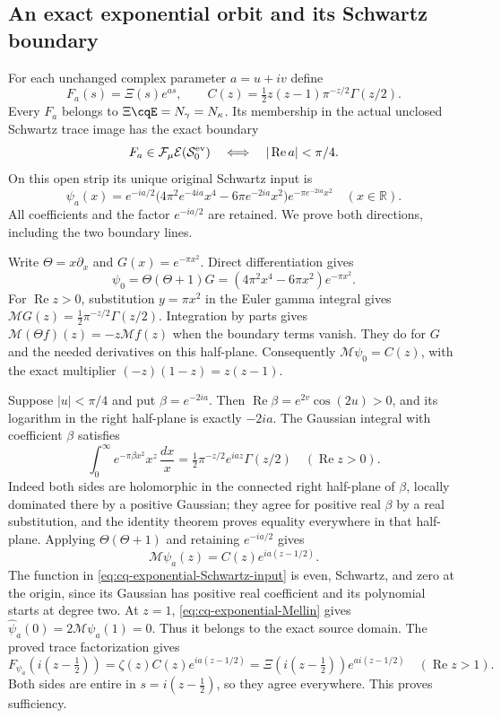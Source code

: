 \subsection{An exact exponential orbit and its Schwartz boundary}
\label{sec:cq-exponential-trace}
For each unchanged complex parameter $a=u+iv$ define
\[
 F_a(s)=\Xi(s)e^{as},\qquad
 C(z)=\tfrac12 z(z-1)\pi^{-z/2}\Gamma(z/2).
\]
Every $F_a$ belongs to $\Xi\cqE=N_\gamma=N_\kappa$.
Its membership in the actual unclosed Schwartz trace image has
the exact boundary
\begin{equation}\label{eq:cq-exponential-Schwartz-domain}
 F_a\in\mathcal F_\mu\mathcal E(\mathcal S_0^{\rm ev})
 \quad\Longleftrightarrow\quad |\operatorname{Re}a|<\pi/4.
\end{equation}
On this open strip its unique original Schwartz input is
\begin{equation}\label{eq:cq-exponential-Schwartz-input}
 \psi_a(x)=e^{-ia/2}
   \bigl(4\pi^2e^{-4ia}x^4-6\pi e^{-2ia}x^2\bigr)
                    e^{-\pi e^{-2ia}x^2}\quad(x\in\mathbb R).
\end{equation}
All coefficients and the factor $e^{-ia/2}$ are retained.
We prove both directions, including the two boundary lines.

Write $\Theta=x\partial_x$ and $G(x)=e^{-\pi x^2}$. Direct
differentiation gives
\[
 \psi_0=\Theta(\Theta+1)G
       =(4\pi^2x^4-6\pi x^2)e^{-\pi x^2}.
\]
For $\operatorname{Re}z>0$, substitution $y=\pi x^2$ in the
Euler gamma integral gives
$\mathcal M G(z)=\frac12\pi^{-z/2}\Gamma(z/2)$.
Integration by parts gives
$\mathcal M(\Theta f)(z)=-z\mathcal M f(z)$ when the boundary
terms vanish. They do for $G$ and the needed derivatives on
this half-plane. Consequently $\mathcal M\psi_0=C(z)$, with
the exact multiplier $(-z)(1-z)=z(z-1)$.

Suppose $|u|<\pi/4$ and put $\beta=e^{-2ia}$. Then
$\operatorname{Re}\beta=e^{2v}\cos(2u)>0$, and its logarithm
in the right half-plane is exactly $-2ia$. The Gaussian
integral with coefficient $\beta$ satisfies
\[
 \int_0^\infty e^{-\pi\beta x^2}x^z\,\frac{dx}{x}
 =\tfrac12\pi^{-z/2}e^{iaz}\Gamma(z/2)
 \quad(\operatorname{Re}z>0).
\]
Indeed both sides are holomorphic in the connected right half-plane
of $\beta$, locally dominated there by a positive Gaussian;
they agree for positive real $\beta$ by a real substitution, and
the identity theorem proves equality everywhere in that half-plane.
Applying $\Theta(\Theta+1)$ and retaining $e^{-ia/2}$ gives
\begin{equation}\label{eq:cq-exponential-Mellin}
 \mathcal M\psi_a(z)=C(z)e^{ia(z-1/2)}.
\end{equation}
The function in \eqref{eq:cq-exponential-Schwartz-input} is even,
Schwartz, and zero at the origin, since its Gaussian has positive
real coefficient and its polynomial starts at degree two.
At $z=1$, \eqref{eq:cq-exponential-Mellin} gives
$\widehat\psi_a(0)=2\mathcal M\psi_a(1)=0$.
Thus it belongs to the exact source domain.
The proved trace factorization gives
\[
 F_{\psi_a}(i(z-\tfrac12))
 =\zeta(z)C(z)e^{ia(z-1/2)}
 =\Xi(i(z-\tfrac12))e^{a i(z-1/2)}
 \quad(\operatorname{Re}z>1).
\]
Both sides are entire in $s=i(z-\tfrac12)$, so they agree
everywhere. This proves sufficiency.

